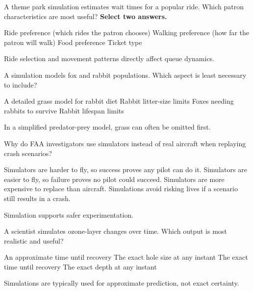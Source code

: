 \question[5]
A theme park simulation estimates wait times for a popular ride. Which patron characteristics are most useful? \textbf{Select two answers.}
\begin{checkboxes}
  \CorrectChoice Ride preference (which rides the patron chooses)
  \CorrectChoice Walking preference (how far the patron will walk)
  \choice Food preference
  \choice Ticket type
\end{checkboxes}
\begin{solution}
  Ride selection and movement patterns directly affect queue dynamics.
\end{solution}

\newpage 

\question[5]
A simulation models fox and rabbit populations. Which aspect is least necessary to include?
\begin{choices}
  \CorrectChoice A detailed grass model for rabbit diet
  \choice Rabbit litter-size limits
  \choice Foxes needing rabbits to survive
  \choice Rabbit lifespan limits
\end{choices}
\begin{solution}
  In a simplified predator-prey model, grass can often be omitted first.
\end{solution}

\question[5]
Why do FAA investigators use simulators instead of real aircraft when replaying crash scenarios?
\begin{choices}
  \choice Simulators are harder to fly, so success proves any pilot can do it.
  \choice Simulators are easier to fly, so failure proves no pilot could succeed.
  \choice Simulators are more expensive to replace than aircraft.
  \CorrectChoice Simulations avoid risking lives if a scenario still results in a crash.
\end{choices}
\begin{solution}
  Simulation supports safer experimentation.
\end{solution}

\question[5]
A scientist simulates ozone-layer changes over time. Which output is most realistic and useful?
\begin{choices}
  \CorrectChoice An approximate time until recovery
  \choice The exact hole size at any instant
  \choice The exact time until recovery
  \choice The exact depth at any instant
\end{choices}
\begin{solution}
  Simulations are typically used for approximate prediction, not exact certainty.
\end{solution}

